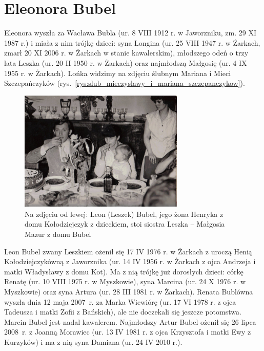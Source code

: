 \section{Eleonora Bubel}

Eleonora wyszła za Wacława Bubla (ur. 8 VIII 1912 r. w Jaworzniku, zm. 29 XI 1987 r.) i miała z nim trójkę dzieci: syna Longina (ur. 25 VIII 1947 r. w Żarkach, zmarł 20 XI 2006 r. w Żarkach w stanie kawalerskim), młodszego odeń o trzy lata Leszka (ur. 20 II 1950 r. w Żarkach) oraz najmłodszą Małgosię (ur. 4 IX 1955 r. w Żarkach). Lońka widzimy na zdjęciu ślubnym Mariana i Mieci Szczepańczyków (rys.~\ref{rys:slub_mieczyslawy_i_mariana_szczepanczykow}).

\begin{figure}
\begin{center}
\includegraphics[width=0.7\textwidth]{zdjecia/leon_henryka_malgosia_bubel.jpg}
\caption[Leon, Henryka i Małgorzata Bublowie]{Na zdjęciu od lewej: Leon (Leszek) Bubel, jego żona Henryka z domu Kołodziejczyk z dzieckiem, stoi siostra Leszka -- Małgosia Mazur z domu Bubel}
\label{rys:leon_henryka_malgosia_bubel}
\end{center}
\end{figure}

Leon Bubel zwany Leszkiem ożenił się 17 IV 1976 r. w Żarkach z uroczą Henią Kołodziejczykówną z Jaworznika (ur. 14 IV 1956 r. w Żarkach z ojca Andrzeja i matki Władysławy z domu Kot). Ma z nią trójkę już dorosłych dzieci: córkę Renatę (ur. 10 VIII 1975 r. w Myszkowie), syna Marcina (ur. 24 X 1976 r. w Myszkowie) oraz syna Artura (ur. 28 III 1981 r. w Żarkach). Renata Bublówna wyszła dnia 12 maja 2007~r. za Marka Wiewiórę (ur. 17 VI 1978 r. z ojca Tadeusza i matki Zofii z Bańskich), ale nie doczekali się jeszcze potomstwa. Marcin Bubel jest nadal kawalerem. Najmłodszy Artur Bubel ożenił się 26 lipca 2008~r. z Joanną Morawiec (ur. 13 IV 1981 r. z ojca Krzysztofa i matki Ewy z Kurzyków) i ma z nią syna Damiana (ur. 24 IV 2010 r.).

